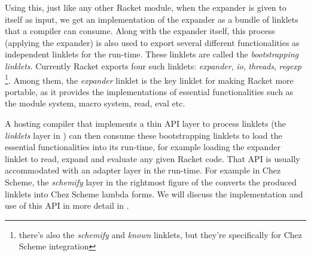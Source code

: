 Using this, just like any other Racket module, when the expander is
given to itself as input, we get an implementation of the expander as
a bundle of linklets that a compiler can consume. Along with the
expander itself, this process (applying the expander) is also used to
export several different functionalities as independent linklets for
the run-time. These linklets are called the
\emph{bootstrapping linklets}. Currently Racket exports four such
linklets: \emph{expander}, \emph{io}, \emph{threads},
\emph{regexp} \footnote{there's also the \emph{schemify} and
  \emph{known} linklets, but they're specifically for Chez Scheme
  integration}. Among them, the \emph{expander} linklet is the key
linklet for making Racket more portable, as it provides the
implementations of essential functionalities such as the module
system, macro system, read, eval etc.

A hosting compiler that implements a thin API layer to process
linklets (the \emph{linklets} layer in )
can then consume these bootstrapping linklets to load the essential
functionalities into its run-time, for example loading the expander
linklet to read, expand and evaluate any given Racket code. That API
is usually accommodated with an adapter layer in the run-time. For
example in Chez Scheme, the \emph{schemify} layer in the rightmost
figure of the  converts the produced
linklets into Chez Scheme lambda forms. We will discuss the
implementation and use of this API in more detail in
.
